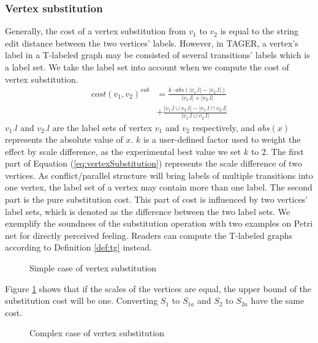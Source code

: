 \documentclass{llncs}
\begin{document}
\subsubsection{Vertex substitution} Generally, the cost of a vertex substitution from $v_{1}$ to $v_{2}$ is equal to the string edit distance between the two vertices' labels. However, in TAGER, a vertex's label in a T-labeled graph may be consisted of several transitions' labels which is a label set. We take the label set into account when we compute the cost of vertex substitution.
\begin{equation}\label{eq:vertexSubstitution}
\begin{aligned}
cost(v_{1},v_{2})^{sub}&=\frac{k\cdot abs(|v_{1}.l|-|v_{2}.l|)}{|v_{1}.l|+|v_{2}.l|}\\
&+\frac{|v_{1}.l\cup v_{2}.l|-|v_{1}.l\cap v_{2}.l|}{|v_{1}.l\cup v_{2}.l|}
\end{aligned}
\end{equation}
$v_{1}.l$ and $v_{2}.l$ are the label sets of vertex $v_{1}$ and $v_{2}$ respectively, and $abs(x)$ represents the absolute value of $x$. $k$ is a user-defined factor used to weight the effect by scale difference, as the experimental best value we set $k$ to 2. The first part of Equation (\ref{eq:vertexSubstitution}) represents the scale difference of two vertices. As conflict/parallel structure will bring labels of multiple transitions into one vertex, the label set of a vertex may contain more than one label. 
The second part is the pure substitution cost. This part of cost is influenced by two vertices' label sets, which is denoted as the difference between the two label sets. 
We exemplify the soundness of the substitution operation with two examples on Petri net for directly perceived feeling. Readers can compute the T-labeled graphs according to Definition \ref{def:tg} instead.
\begin{example}
\begin{figure}[htb]
\centering
{}
\caption{Simple case of vertex substitution\label{fig:exSuba}}
\end{figure}
Figure \ref{fig:exSuba} shows that if the scales of the vertices are equal, the upper bound of the substitution cost will be one. Converting $S_{1}$ to $S_{1a}$ and $S_{2}$ to $S_{2a}$ have the same cost.
\end{example}
\begin{figure}[!htb]
\centering
{}
\caption{Complex case of vertex substitution\label{fig:exSubb}}
\end{figure}
\end{document}
